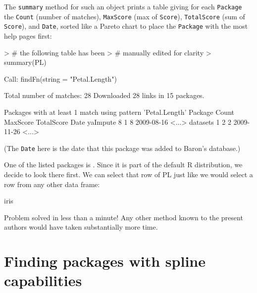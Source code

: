 \documentclass[a4paper]{report}
\begin{document}
\begin{article}
The {\tt summary} method for such an object prints a table giving
for each {\tt Package} the {\tt Count} (number of matches),
{\tt MaxScore} (max of {\tt Score}), {\tt TotalScore} (sum of
{\tt Score}), and {\tt Date}, sorted like a Pareto chart to place
the {\tt Package} with the most help pages first:
\begin{Schunk}
\begin{Sinput}
> # the following table has been
> # manually edited for clarity
> summary(PL)
\end{Sinput}
\end{Schunk}
\begin{Schunk}
\begin{Soutput}
Call:
findFn(string = "Petal.Length")

Total number of matches: 28
Downloaded 28 links in 15 packages.

Packages with at least 1 match using pattern
  'Petal.Length'
  Package Count MaxScore TotalScore       Date
 yaImpute     8        1          8 2009-08-16
    <...>                                     
 datasets     1        2          2 2009-11-26
    <...>                                     
\end{Soutput}
\end{Schunk}
(The {\tt Date} here is the date that this package was added
to Baron's database.)

One of the listed packages is .  Since it is part of the
default R distribution, we decide to look there first.  We can
select that row of PL just like we would select a row from any other
data frame:
\begin{Schunk}
\end{Schunk}
\begin{Schunk}
\begin{Soutput}
[1] iris
\end{Soutput}
\end{Schunk}
Problem solved in less than a minute!  Any other method known
to the present authors would have taken substantially more time.

\section{Finding packages with spline capabilities}


\end{article}
\end{document}
